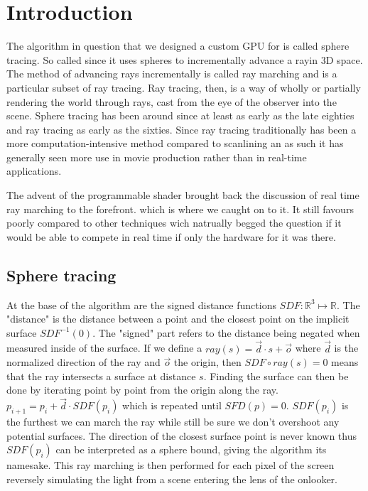 \chapter{Introduction} 

The algorithm in question that we designed a custom GPU for is called sphere
tracing.\cite{Hart1996} So called since it uses spheres to incrementally
advance a ray\footnotemark in 3D space. The method of advancing rays
incrementally is called ray marching and is a particular subset of ray
tracing.\cite{Whitted1980} Ray tracing, then, is a way of wholly or partially
rendering the world through rays, cast from the eye of the observer into the
scene.  Sphere tracing has been around since at least as early as the late
eighties and ray tracing as early as the sixties.\cite{Hart1989,Appel1968}
Since ray tracing traditionally has been a more computation-intensive method
compared to scanlining\cite{Wylie1967} an as such it has generally seen more
use in movie production rather than in real-time applications.\cite{ref_needed?} 


The advent of the programmable shader brought back the discussion of real time
ray marching to the forefront. which is where we caught on to it.
\cite{JamieWong2016} It still favours poorly compared to other techniques wich
natrually begged the question if it would be able to compete in real time if
only the hardware for it was there.


\section{Sphere tracing}
	At the base of the algorithm are the signed distance functions
	$SDF:\mathbb{R}^{3}\mapsto\mathbb{R}$. The "distance" is the distance
	between a point and the closest point on the implicit surface
	$SDF^{-1}(0)$. The "signed" part refers to the distance being negated when
	measured inside of the surface.  If we define a $ray(s) = \vec{d} \cdot s +
	\vec{o}$ where $\vec{d}$ is the normalized direction of the ray and
	$\vec{o}$ the origin, then $SDF\circ ray(s) = 0$ means that the ray
	intersects a surface at distance $s$. Finding the surface can then be done
	by iterating point by point from the origin along the ray.  $p_{i+1} = p_i
	+ \vec{d}\cdot SDF(p_i)$ which is repeated until $SFD(p) = 0$.  $SDF(p_i)$
	is the furthest we can march the ray while still be sure we don't overshoot
	any potential surfaces. The direction of the closest surface point is never
	known thus $SDF(p_i)$ can be interpreted as a sphere bound, giving the
	algorithm its namesake. This ray marching is then performed for each pixel
	of the screen reversely simulating the light from a scene entering the lens
	of the onlooker.
	

